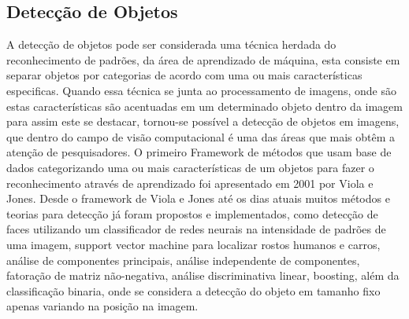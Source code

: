 \subsection{Detecção de Objetos}
\label{Sec:TiposDeDeteccaoDeObjetos}
	

A detecção de objetos pode ser considerada uma técnica herdada do reconhecimento de padrões, da área de aprendizado de máquina, esta consiste em separar objetos por categorias de acordo com uma ou mais características especificas. Quando essa técnica se junta ao processamento de imagens, onde são estas características são acentuadas em um determinado objeto dentro da imagem para assim este se destacar, tornou-se possível a detecção de objetos em imagens, que dentro do campo de visão computacional é uma das áreas que mais obtêm a atenção de pesquisadores. 
O primeiro Framework de métodos que usam base de dados categorizando uma ou mais características de um objetos para fazer o reconhecimento através de aprendizado foi apresentado em 2001 por Viola e Jones\cite{Viola:2001}. Desde o framework de Viola e Jones até os dias atuais muitos métodos e teorias para detecção já foram propostos e implementados, como detecção de faces utilizando um classificador de redes neurais na intensidade de padrões de uma imagem, support vector machine para localizar rostos humanos e carros\cite{Nascimento:2007}, análise de componentes principais, análise independente de componentes, fatoração de matriz não-negativa, análise discriminativa linear, boosting\cite{Roth:2008}, além da classificação binaria, onde se considera a detecção do objeto em tamanho fixo apenas variando na posição na imagem\cite{AmitFelzenszwalb:2014}. 


